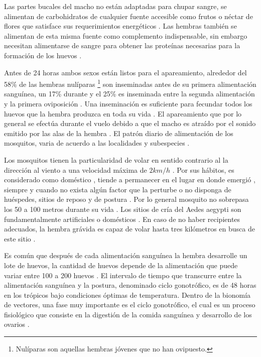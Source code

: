 Las partes bucales del macho no están adaptadas para chupar sangre, se alimentan de carbohidratos
de cualquier fuente accesible como frutos o néctar de flores que satisface sus requerimientos
energéticos \cite{ThironIzcazaJ2003}. Las hembras también se alimentan de esta misma fuente como
complemento indispensable, sin embargo necesitan alimentarse de sangre para obtener las proteínas
necesarias para la formación de los huevos \cite{ThironIzcazaJ2003}.

Antes de 24 horas ambos sexos están listos para el apareamiento, alrededor del 58\% de las hembras
nulíparas \footnote{Nulíparas son aquellas hembras jóvenes que no han ovipuesto.} son inseminadas
antes de su primera alimentación sanguínea, un 17\% durante y el 25\% es inseminada entre la
segunda alimentación y la primera oviposición \cite{ThironIzcazaJ2003}. Una inseminación es
suficiente para fecundar todos los huevos que la hembra produzca en toda su vida
\cite{ThironIzcazaJ2003}. El apareamiento que por lo general se efectúa durante el vuelo debido a
que el macho es atraído por  el sonido emitido por las alas de la hembra \cite{ThironIzcazaJ2003}.
El patrón diario de alimentación de los mosquitos, varia de acuerdo a las localidades y subespecies
\cite{luevano1993ciclo}.

Los mosquitos tienen la particularidad de volar en sentido contrario al la dirección al viento a
una velocidad máxima de $2 km/h$ \cite{web-site:speedAnimals}.  Por sus hábitos, es considerado
como doméstico \cite{luevano1993ciclo}, tiende a permanecer en el lugar en donde emergió
\cite{cabezas2005dengue,ThironIzcazaJ2003}, siempre y cuando no exista algún factor que la
perturbe o no disponga de huéspedes, sitios de reposo y de postura  \cite{ThironIzcazaJ2003}. Por
lo general mosquito no sobrepasa los 50 a 100 metros durante su vida \cite{cabezas2005dengue}. Los
sitios de cría del Aedes aegypti son fundamentalmente artificiales o domésticos
\cite{directricesDetvArg}. En caso de no haber recipientes adecuados, la hembra grávida es capaz
de volar hasta tres kilómetros en busca de este sitio \cite{ThironIzcazaJ2003}.

Es común que después de cada alimentación sanguínea la hembra desarrolle un lote de huevos, la
cantidad de huevos depende de la alimentación que puede variar entre 100 a 200 huevos
\cite{cabezas2005dengue}. El intervalo de tiempo que transcurre entre la alimentación sanguínea y
la postura, denominado ciclo gonotrófico, es de 48 horas en los trópicos bajo condiciones óptimas
de temperatura\cite{ThironIzcazaJ2003}. Dentro de la bionomía de vectores, una fase muy importante
es el ciclo gonotrófico, el cual es un proceso fisiológico que consiste en la digestión de la
comida sanguínea y desarrollo de los ovarios \cite{luevano1993ciclo}.
